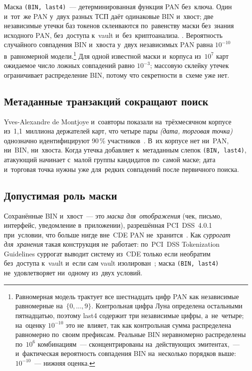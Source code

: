 Маска \texttt{(BIN, last4)}~--- детерминированная функция PAN без~ключа.
Один и~тот~же PAN у~двух разных ТСП даёт одинаковые BIN и~хвост;
две независимые утечки баз токенов склеиваются по~равенству
маски без~знания исходного PAN, без~доступа к~vault и~без~криптоанализа.
. Вероятность
случайного совпадения BIN и~хвоста у~двух независимых PAN равна
$10^{-10}$ в~равномерной модели.\footnote{Равномерная модель трактует все
  шестнадцать цифр PAN как независимые равномерные на~$\{0,\ldots,9\}$.
  Контрольная цифра Луна определена остальными пятнадцатью, поэтому last4
  содержит три независимые цифры, а~не~четыре; на~оценку $10^{-10}$ это
  не~влияет, так как контрольная сумма распределена равномерно
  по~своим префиксам. Реальные BIN неравномерно распределены по~$10^6$
  комбинациям~--- сконцентрированы на~действующих эмитентах,~--- и~фактическая
  вероятность совпадения BIN на~несколько порядков выше: $10^{-10}$~---
нижняя оценка.} Для одной известной маски и~корпуса
из~$10^7$ карт ожидаемое число ложных совпадений равно $10^{-3}$;
массовую склейку утечек ограничивает распределение BIN, потому что
секретности в~схеме уже нет.

\subsection*{Метаданные транзакций сокращают поиск}

Yves-Alexandre de Montjoye и~соавторы показали на~трёхмесячном корпусе
из~1{,}1~миллиона держателей карт, что четыре пары
\emph{(дата, торговая точка)} однозначно идентифицируют 90\,\%
участников~\cite{de-montjoye-credit-2015}. В~их корпусе нет ни~PAN,
ни~BIN, ни~хвоста. Когда утечка добавляет к~метаданным слепок
\texttt{(BIN, last4)}, атакующий начинает с~малой группы кандидатов
по~самой маске; дата и~торговая точка нужны уже для~редких совпадений
после первичного поиска.

\subsection*{Допустимая роль маски}

Сохранённые BIN и~хвост~--- это \emph{маска для~отображения} (чек,
письмо, интерфейс, уведомление в~приложении), разрешённая PCI~DSS~4.0.1
при~условии, что больше нигде вне~CDE PAN
не~хранится~\cite{pci-dss-4,pci-faq-1492}.
Как \emph{суррогат для~хранения} такая конструкция не~работает:
по~PCI~DSS Tokenization Guidelines суррогат выводит систему из~CDE
только если необратим без~доступа к~vault и~если сам vault
изолирован~\cite{pci-tokenization-guidelines}; маска
\texttt{(BIN, last4)} не~удовлетворяет ни~одному из~двух условий.

